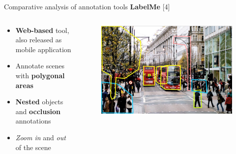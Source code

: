 \documentclass{beamer}
\begin{document}
\begin{tframe}{Comparative analysis of annotation tools}
\textbf{LabelMe }[4]
\begin{columns}[t] %
\begin{column}{.5\textwidth}
\begin{itemize}
\item \textbf{Web-based} tool, also released as mobile application
\vspace{0.2cm}
\item Annotate scenes with \textbf{polygonal areas}
\vspace{0.2cm}
\item \textbf{Nested} objects and \textbf{occlusion} annotations
\vspace{0.2cm}
\item \emph{Zoom in} and \emph{out} of the scene
\end{itemize}
\end{column}%
\begin{column}{.3\textwidth}
\begin{figure}[h]
\centering
\includegraphics[width=1\textwidth]{images/labelme.jpg}
\end{figure}
\end{column}%
\end{columns}
\end{tframe}
\end{document}
